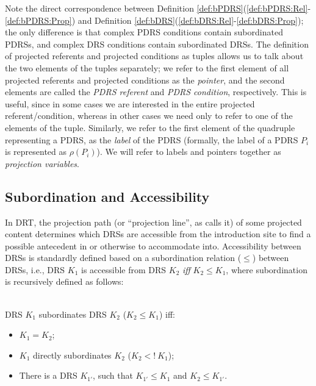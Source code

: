 \noindent Note the direct correspondence between Definition
\ref{def:bPDRS}(\ref{def:bPDRS:Rel}-\ref{def:bPDRS:Prop}) and Definition
\ref{def:bDRS}(\ref{def:bDRS:Rel}-\ref{def:bDRS:Prop}); the only difference
is that complex PDRS conditions contain subordinated PDRSs, and complex DRS
conditions contain subordinated DRSs.  The definition of projected referents
and projected conditions as tuples allows us to talk about the two elements
of the tuples separately; we refer to the first element of all projected
referents and projected conditions as the \textit{pointer}, and the second
elements are called the \textit{PDRS referent} and \textit{PDRS condition},
respectively. This is useful, since in some cases we are interested in the
entire projected referent/condition, whereas in other cases we need only to
refer to one of the elements of the tuple. Similarly, we refer to the first
element of the quadruple representing a PDRS, as the \textit{label} of the
PDRS (formally, the label of a PDRS $P_i$ is represented as $\rho(P_i)$).
We will refer to labels and pointers together as \textit{projection
variables}.

\subsection{Subordination and Accessibility}

In DRT, the projection path (or ``projection line'', as
 calls it) of some projected content
determines which DRSs are accessible from the introduction site to find
a possible antecedent in or otherwise to accommodate into. Accessibility
between DRSs is standardly defined based on a subordination relation
($\leq$) between DRSs, i.e., DRS $K_1$ is accessible from DRS $K_2$
\textit{iff} $K_2\leq K_1$, where subordination is recursively defined as
follows:

\begin{definition}\label{def:DRSsub}~\\
DRS $K_1$ subordinates DRS $K_2$ ($K_2 \leq K_1$) iff:
  \begin{itemize}
    \item $K_1 = K_2$;
    \item $K_1$ directly subordinates $K_2$ ($K_2 <!~K_1$);
    \item There is a DRS $K_{1'}$, such that $K_{1'} \leq K_1$ and 
      $K_2 \leq K_{1'}$.
  \end{itemize}
\end{definition}

